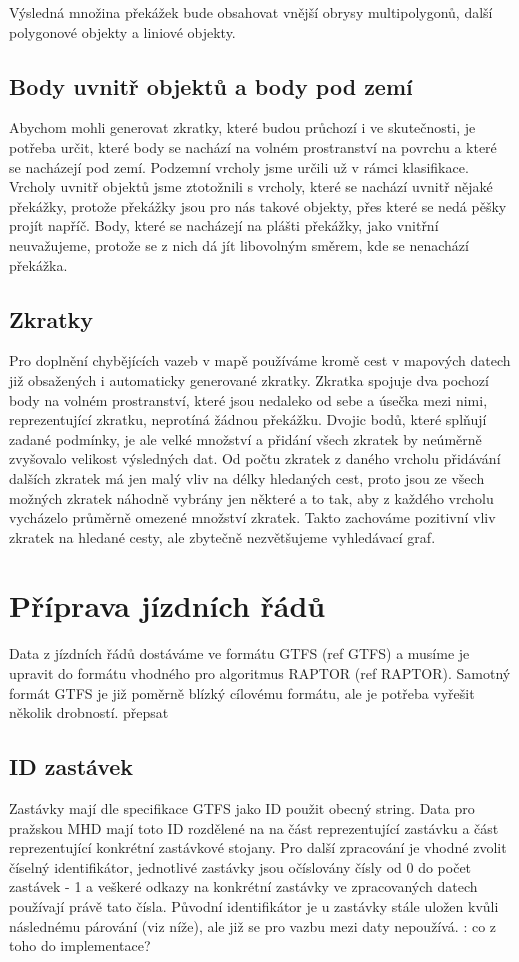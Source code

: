 Výsledná množina překážek bude obsahovat vnější obrysy multipolygonů, další
polygonové objekty a liniové objekty.

\subsection{Body uvnitř objektů a body pod zemí}
Abychom mohli generovat zkratky, které budou průchozí i ve skutečnosti, je
potřeba určit, které body se nachází na volném prostranství na povrchu a které
se nacházejí pod zemí. Podzemní vrcholy jsme určili už v rámci klasifikace.
Vrcholy uvnitř objektů jsme ztotožnili s vrcholy, které se nachází uvnitř nějaké
překážky, protože překážky jsou pro nás takové objekty, přes které se nedá pěšky
projít napříč. Body, které se nacházejí na plášti překážky, jako vnitřní
neuvažujeme, protože se z nich dá jít libovolným směrem, kde se nenachází
překážka.

\subsection{Zkratky}
Pro doplnění chybějících vazeb v mapě používáme kromě cest v mapových datech
již obsažených i automaticky generované zkratky. Zkratka spojuje dva pochozí
body na volném prostranství, které jsou nedaleko od sebe a úsečka mezi nimi,
reprezentující zkratku, neprotíná žádnou překážku. Dvojic bodů, které splňují
zadané podmínky, je ale velké množství a přidání všech zkratek by neúměrně
zvyšovalo velikost výsledných dat. Od počtu zkratek z daného vrcholu přidávání
dalších zkratek má jen malý vliv na délky hledaných cest, proto jsou ze všech
možných zkratek náhodně vybrány jen některé a to tak, aby z každého vrcholu
vycházelo průměrně omezené množství zkratek. Takto zachováme pozitivní vliv
zkratek na hledané cesty, ale zbytečně nezvětšujeme vyhledávací graf.

\section{Příprava jízdních řádů}
Data z jízdních řádů dostáváme ve formátu GTFS (\TODO ref GTFS) a musíme je
upravit do formátu vhodného pro algoritmus RAPTOR (\TODO ref RAPTOR). Samotný
formát GTFS je již poměrně blízký cílovému formátu, ale je potřeba vyřešit
několik drobností. \TODO přepsat

\subsection{ID zastávek}
Zastávky mají dle specifikace GTFS jako ID použit obecný string. Data pro
pražskou MHD mají toto ID rozdělené na na část reprezentující zastávku a část
reprezentující konkrétní zastávkové stojany. Pro další zpracování je vhodné
zvolit číselný identifikátor, jednotlivé zastávky jsou očíslovány čísly od 0 do
počet zastávek - 1 a veškeré odkazy na konkrétní zastávky ve zpracovaných datech
používají právě tato čísla. Původní identifikátor je u zastávky stále uložen
kvůli následnému párování (viz níže), ale již se pro vazbu mezi daty nepoužívá.
\TODO: co z toho do implementace?

